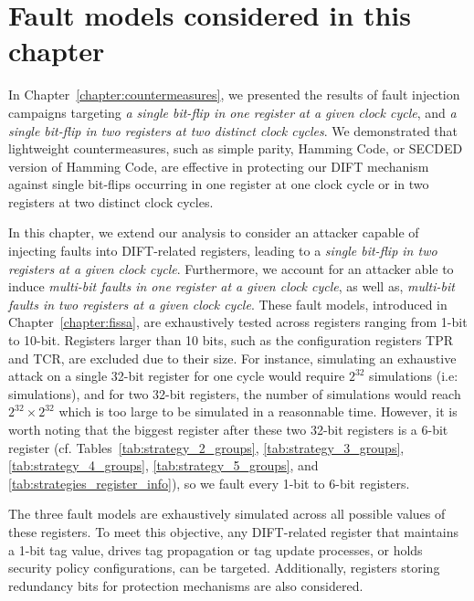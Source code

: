 \section{Fault models considered in this chapter}
\label{section:chap6_faultmodels}
In Chapter~\ref{chapter:countermeasures}, we presented the results of fault injection campaigns targeting \textit{a single bit-flip in one register at a given clock cycle}, and \textit{a single bit-flip in two registers at two distinct clock cycles}. We demonstrated that lightweight countermeasures, such as simple parity, Hamming Code, or SECDED version of Hamming Code, are effective in protecting our DIFT mechanism against single bit-flips occurring in one register at one clock cycle or in two registers at two distinct clock cycles.

In this chapter, we extend our analysis to consider an attacker capable of injecting faults into DIFT-related registers, leading to a \textit{single bit-flip in two registers at a given clock cycle}. Furthermore, we account for an attacker able to induce \textit{multi-bit faults in one register at a given clock cycle}, as well as, \textit{multi-bit faults in two registers at a given clock cycle}. These fault models, introduced in Chapter~\ref{chapter:fissa}, are exhaustively tested across registers ranging from 1-bit to 10-bit. Registers larger than 10 bits, such as the configuration registers TPR and TCR, are excluded due to their size. For instance, simulating an exhaustive attack on a single 32-bit register for one cycle would require $2^{32}$ simulations (i.e:  simulations), and for two 32-bit registers, the number of simulations would reach $2^{32} \times 2^{32}$ which is too large to be simulated in a reasonnable time. However, it is worth noting that the biggest register after these two 32-bit registers is a 6-bit register (cf. Tables~\ref{tab:strategy_2_groups}, \ref{tab:strategy_3_groups}, \ref{tab:strategy_4_groups}, \ref{tab:strategy_5_groups}, and \ref{tab:strategies_register_info}), so we fault every 1-bit to 6-bit registers.

The three fault models are exhaustively simulated across all possible values of these registers. To meet this objective, any DIFT-related register that maintains a 1-bit tag value, drives tag propagation or tag update processes, or holds security policy configurations, can be targeted. Additionally, registers storing redundancy bits for protection mechanisms are also considered.


